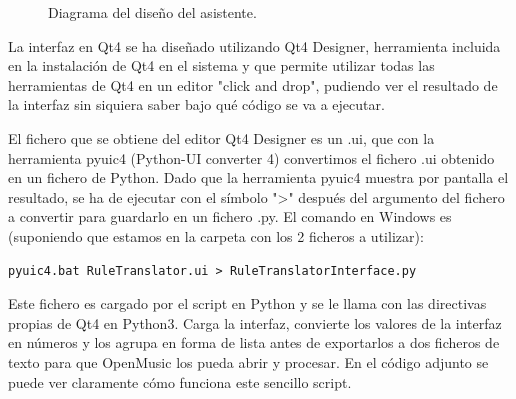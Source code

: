 \documentclass[a4paper,openright,12pt]{book}
\begin{document}
\begin{figure}
\centering
\noindent{}
\caption{Diagrama del diseño del asistente.} \label{fig:softwarediagram}
\end{figure}

La interfaz en Qt4 se ha diseñado utilizando Qt4 Designer, herramienta incluida en la instalación de Qt4 en el sistema y que permite utilizar todas las herramientas de Qt4 en un editor "click and drop", pudiendo ver el resultado de la interfaz sin siquiera saber bajo qué código se va a ejecutar.

El fichero que se obtiene del editor Qt4 Designer es un .ui, que con la herramienta pyuic4 (Python-UI converter 4) convertimos el fichero .ui obtenido en un fichero de Python. Dado que la herramienta pyuic4 muestra por pantalla el resultado, se ha de ejecutar con el símbolo ">" después del argumento del fichero a convertir para guardarlo en un fichero .py. El comando en Windows es (suponiendo que estamos en la carpeta con los 2 ficheros a utilizar):

   \lstset{language=Bash,
           basicstyle=\ttfamily\scriptsize,
           keywordstyle=\ttfamily,
           stringstyle=\ttfamily,
           commentstyle=\ttfamily,
          breaklines=true
          }
\begin{lstlisting}
pyuic4.bat RuleTranslator.ui > RuleTranslatorInterface.py
\end{lstlisting}

Este fichero es cargado por el script en Python y se le llama con las directivas propias de Qt4 en Python3. Carga la interfaz, convierte los valores de la interfaz en números y los agrupa en forma de lista antes de exportarlos a dos ficheros de texto para que OpenMusic los pueda abrir y procesar. En el código adjunto se puede ver claramente cómo funciona este sencillo script.
\end{document}
